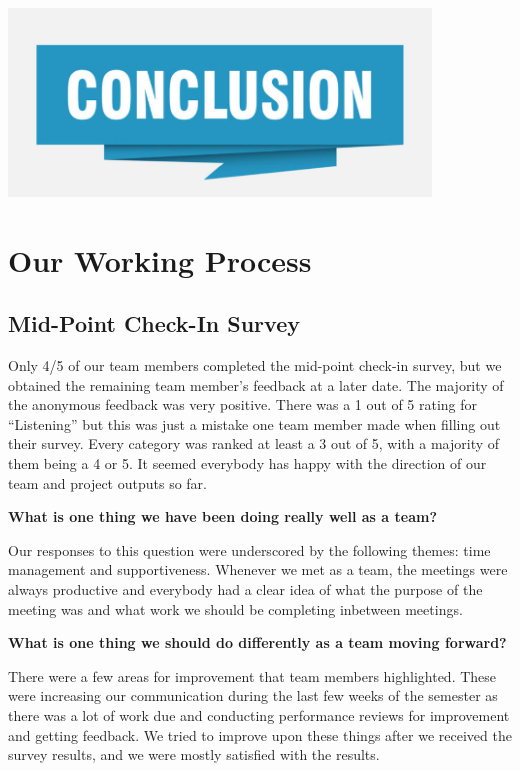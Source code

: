 \documentclass[
]{book}
\begin{document}
\includegraphics[width=4.41667in,height=\textheight]{conclusion pic.png}

\hypertarget{our-working-process}{%
\chapter{Our Working Process}\label{our-working-process}}

\hypertarget{mid-point-check-in-survey}{%
\section{Mid-Point Check-In Survey}\label{mid-point-check-in-survey}}

Only 4/5 of our team members completed the mid-point check-in survey, but we obtained the remaining team member's feedback at a later date. The majority of the anonymous feedback was very positive. There was a 1 out of 5 rating for ``Listening'' but this was just a mistake one team member made when filling out their survey. Every category was ranked at least a 3 out of 5, with a majority of them being a 4 or 5. It seemed everybody has happy with the direction of our team and project outputs so far.~

\textbf{What is one thing we have been doing really well as a team?}

Our responses to this question were underscored by the following themes: time management and supportiveness. Whenever we met as a team, the meetings were always productive and everybody had a clear idea of what the purpose of the meeting was and what work we should be completing inbetween meetings.

\textbf{What is one thing we should do differently as a team moving forward?}

There were a few areas for improvement that team members highlighted. These were increasing our communication during the last few weeks of the semester as there was a lot of work due and conducting performance reviews for improvement and getting feedback. We tried to improve upon these things after we received the survey results, and we were mostly satisfied with the results.
\end{document}
